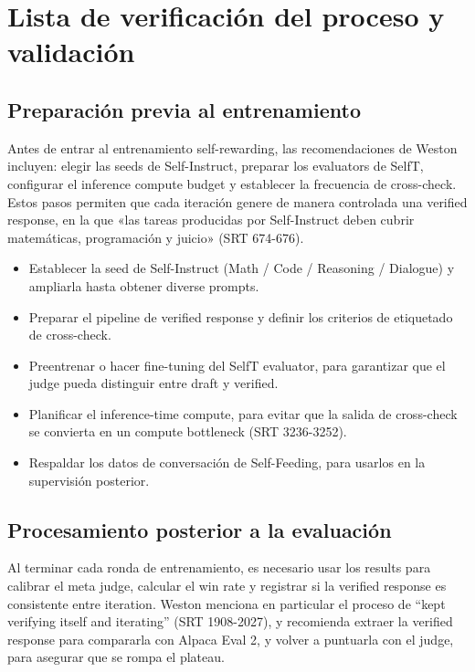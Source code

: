 \section{Lista de verificación del proceso y validación}
\subsection{Preparación previa al entrenamiento}
Antes de entrar al entrenamiento self-rewarding, las recomendaciones de Weston incluyen: elegir las seeds de Self-Instruct, preparar los evaluators de SelfT, configurar el inference compute budget y establecer la frecuencia de cross-check. Estos pasos permiten que cada iteración genere de manera controlada una verified response, en la que «las tareas producidas por Self-Instruct deben cubrir matemáticas, programación y juicio» (SRT 674-676).

\begin{itemize}
    \item Establecer la seed de Self-Instruct (Math / Code / Reasoning / Dialogue) y ampliarla hasta obtener diverse prompts.
    \item Preparar el pipeline de verified response y definir los criterios de etiquetado de cross-check.
    \item Preentrenar o hacer fine-tuning del SelfT evaluator, para garantizar que el judge pueda distinguir entre draft y verified.
    \item Planificar el inference-time compute, para evitar que la salida de cross-check se convierta en un compute bottleneck (SRT 3236-3252).
    \item Respaldar los datos de conversación de Self-Feeding, para usarlos en la supervisión posterior.
\end{itemize}

\subsection{Procesamiento posterior a la evaluación}
Al terminar cada ronda de entrenamiento, es necesario usar los results para calibrar el meta judge, calcular el win rate y registrar si la verified response es consistente entre iteration. Weston menciona en particular el proceso de ``kept verifying itself and iterating'' (SRT 1908-2027), y recomienda extraer la verified response para compararla con Alpaca Eval 2, y volver a puntuarla con el judge, para asegurar que se rompa el plateau.

